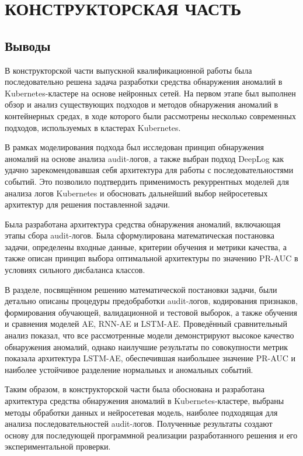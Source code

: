 \section{КОНСТРУКТОРСКАЯ ЧАСТЬ}








\subsection{Выводы}

В конструкторской части выпускной квалификационной работы была последовательно решена задача разработки средства обнаружения аномалий в Kubernetes-кластере на основе нейронных сетей. На первом этапе был выполнен обзор и анализ существующих подходов и методов обнаружения аномалий в контейнерных средах, в ходе которого были рассмотрены несколько современных подходов, используемых в кластерах Kubernetes.

В рамках моделирования подхода был исследован принцип обнаружения аномалий на основе анализа audit-логов, а также выбран подход DeepLog как удачно зарекомендовавшая себя архитектура для работы с последовательностями событий. Это позволило подтвердить применимость рекуррентных моделей для анализа логов Kubernetes и обосновать дальнейший выбор нейросетевых архитектур для решения поставленной задачи.

Была разработана архитектура средства обнаружения аномалий, включающая этапы сбора audit-логов. Была сформулирована математическая постановка задачи, определены входные данные, критерии обучения и метрики качества, а также описан принцип выбора оптимальной архитектуры по значению PR-AUC в условиях сильного дисбаланса классов.

В разделе, посвящённом решению математической постановки задачи, были детально описаны процедуры предобработки audit-логов, кодирования признаков, формирования обучающей, валидационной и тестовой выборок, а также обучения и сравнения моделей AE, RNN-AE и LSTM-AE. Проведённый сравнительный анализ показал, что все рассмотренные модели демонстрируют высокое качество обнаружения аномалий, однако наилучшие результаты по совокупности метрик показала архитектура LSTM-AE, обеспечившая наибольшее значение PR-AUC и наиболее устойчивое разделение нормальных и аномальных событий.

Таким образом, в конструкторской части была обоснована и разработана архитектура средства обнаружения аномалий в Kubernetes-кластере, выбраны методы обработки данных и нейросетевая модель, наиболее подходящая для анализа последовательностей audit-логов. Полученные результаты создают основу для последующей программной реализации разработанного решения и его экспериментальной проверки.